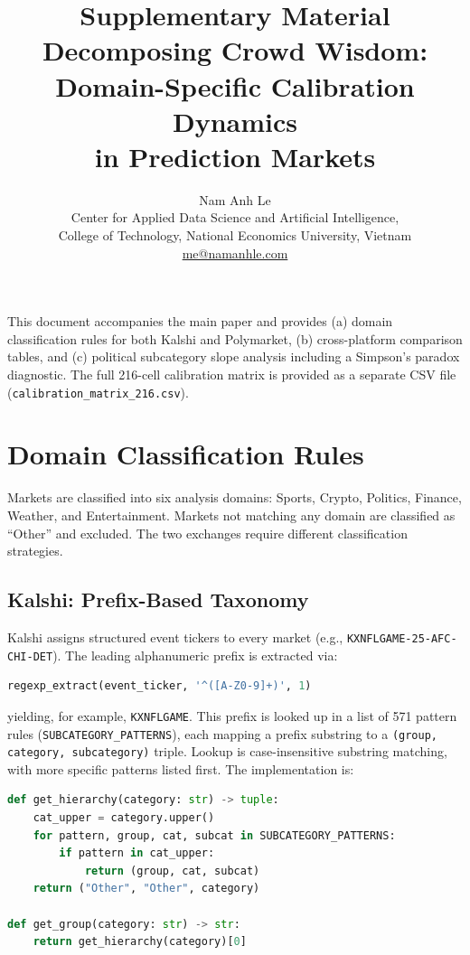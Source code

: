 \documentclass[11pt,a4paper]{article}
\title{\textbf{Supplementary Material}\\[6pt]
\large Decomposing Crowd Wisdom: Domain-Specific Calibration Dynamics\\in Prediction Markets}
\author{Nam Anh Le\\
\small Center for Applied Data Science and Artificial Intelligence,\\
\small College of Technology, National Economics University, Vietnam\\
\small \href{mailto:me@namanhle.com}{me@namanhle.com}}
\date{}
\begin{document}
\maketitle

\noindent This document accompanies the main paper and provides (a) domain classification rules for both Kalshi and Polymarket, (b) cross-platform comparison tables, and (c) political subcategory slope analysis including a Simpson's paradox diagnostic. The full 216-cell calibration matrix is provided as a separate CSV file (\texttt{calibration\_matrix\_216.csv}).

\tableofcontents
\vspace{1em}

\section{Domain Classification Rules}\label{sec:classification}

Markets are classified into six analysis domains: Sports, Crypto, Politics, Finance, Weather, and Entertainment. Markets not matching any domain are classified as ``Other'' and excluded. The two exchanges require different classification strategies.

\subsection{Kalshi: Prefix-Based Taxonomy}\label{sec:kalshi_class}

Kalshi assigns structured event tickers to every market (e.g., \texttt{KXNFLGAME-25-AFC-CHI-DET}). The leading alphanumeric prefix is extracted via:

\begin{lstlisting}[language=SQL]
regexp_extract(event_ticker, '^([A-Z0-9]+)', 1)
\end{lstlisting}

\noindent yielding, for example, \texttt{KXNFLGAME}. This prefix is looked up in a list of 571 pattern rules (\texttt{SUBCATEGORY\allowbreak\_PATTERNS}), each mapping a prefix substring to a \texttt{(group, category, subcategory)} triple. Lookup is case-insensitive substring matching, with more specific patterns listed first. The implementation is:

\begin{lstlisting}[language=Python]
def get_hierarchy(category: str) -> tuple:
    cat_upper = category.upper()
    for pattern, group, cat, subcat in SUBCATEGORY_PATTERNS:
        if pattern in cat_upper:
            return (group, cat, subcat)
    return ("Other", "Other", category)

def get_group(category: str) -> str:
    return get_hierarchy(category)[0]
\end{lstlisting}
\end{document}
